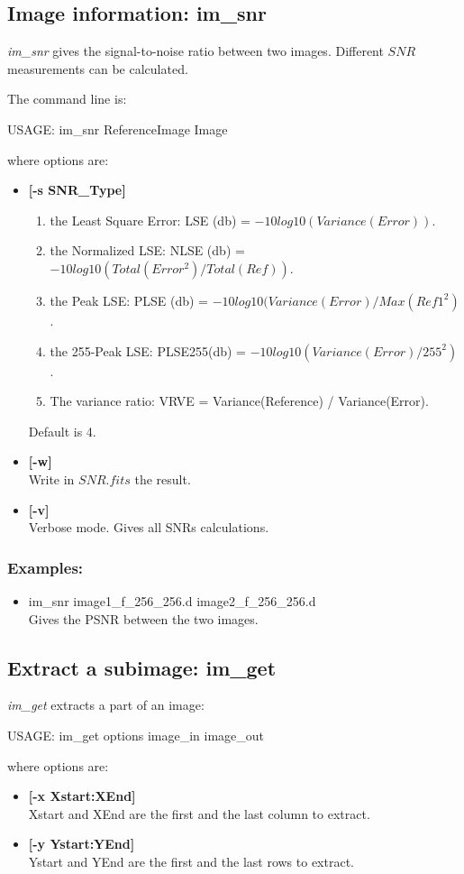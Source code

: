 \subsection{Image information: im\_snr}
{\em im\_snr} gives the signal-to-noise ratio between two images.
Different $SNR$ measurements can be calculated.

The command line is:
{\bf
\begin{center}
     USAGE: im\_snr ReferenceImage Image
\end{center}
}
where options are:
\begin{itemize}
\item {\bf[-s SNR\_Type]} 
\begin{enumerate}
\baselineskip=0.4truecm
\item the Least Square Error: LSE (db) = $-10 log10(Variance(Error))$.
\item the Normalized LSE: NLSE (db) = $ -10 log10(Total(Error^2) / Total(Ref))$.
\item the Peak LSE: PLSE (db) = $ -10 log10(Variance(Error) / Max(Ref1^2)$.
\item the 255-Peak LSE: PLSE255(db) = $-10 log10(Variance(Error)/255^2)$.
\item The variance ratio: VRVE = Variance(Reference) / Variance(Error).
\end{enumerate}  
Default is 4.
\item {\bf[-w]} \\
Write in $SNR.fits$ the result.
\item {\bf[-v]} \\
Verbose mode. Gives all SNRs calculations.
\end{itemize}

\subsubsection*{Examples:}
\begin{itemize}
\item im\_snr image1\_f\_256\_256.d  image2\_f\_256\_256.d\\
Gives the PSNR between the two images.
\end{itemize}

\subsection{Extract a subimage: im\_get}

{\em im\_get} extracts a part of an image:
{\bf
\begin{center}
USAGE: im\_get options image\_in image\_out
\end{center}
}
where options are:
\begin{itemize}
\item {\bf[-x Xstart:XEnd]} \\
Xstart and XEnd are the first and the last column to extract.
\item {\bf[-y Ystart:YEnd]} \\
Ystart and YEnd are the first and the last rows to extract.
\end{itemize}

